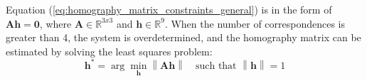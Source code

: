 Equation (\ref{eq:homography_matrix_constraints_general}) is in the form of 
$\boldsymbol{Ah} = \boldsymbol{0}$, where $\boldsymbol{A} \in \mathbb{R}^{3x3}$
and $\boldsymbol{h} \in \mathbb{R}^{9}$.
When the number of correspondences is greater than 4, the system is overdetermined, 
and the homography matrix can be estimated by solving the least squares problem:
\begin{equation}
    \boldsymbol{h}^* = \arg \min_{\boldsymbol{h}} \left\| \boldsymbol{Ah} \right\|
    \quad
    \text{such that }
    \left\| \boldsymbol{h} \right\| = 1
    \label{eq:homography_least_squares}
\end{equation}
